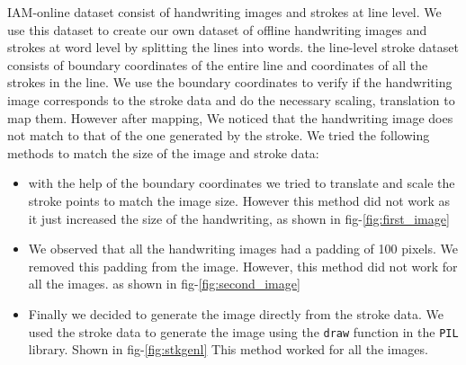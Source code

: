 \documentclass[10pt,twocolumn,letterpaper]{article}
\begin{document}
IAM-online dataset consist of handwriting images and strokes at line level. We use this dataset to create our own dataset of offline handwriting images and strokes at word level by splitting the lines into words. the line-level stroke dataset consists of boundary coordinates of the entire line and coordinates of all the strokes in the line. We use the boundary coordinates to verify if the handwriting image corresponds to the stroke data and do the necessary scaling, translation to map them. However after mapping, We noticed that the handwriting image does not match to that of the one generated by the stroke. We tried the following methods to match the size of the image and stroke data:
\begin{itemize}
 \item with the help of the boundary coordinates we tried to translate and scale the stroke points to match the image size. However this method did not work as it just increased the size of the handwriting, as shown in fig-\ref{fig:first_image}
  \item We observed that all the handwriting images had a padding of 100 pixels. We removed this padding from the image. However, this method did not work for all the images. as shown in fig-\ref{fig:second_image}
  \item Finally we decided to generate the image directly from the stroke data. We used the stroke data to generate the image using the \texttt{draw} function in the \texttt{PIL} library. Shown in fig-\ref{fig:stkgenl} This method worked for all the images.
\end{itemize}
\end{document}
